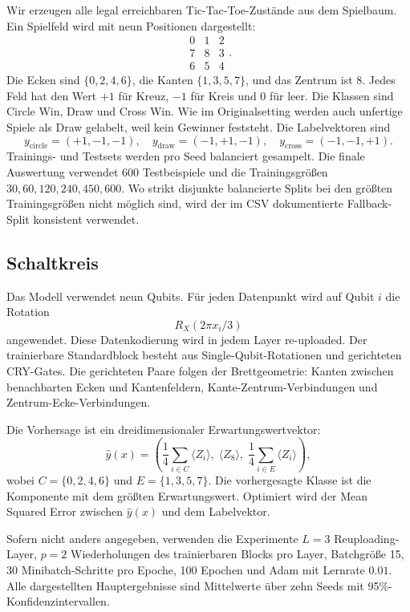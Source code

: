 Wir erzeugen alle legal erreichbaren Tic-Tac-Toe-Zustände aus dem Spielbaum. Ein Spielfeld wird mit neun Positionen dargestellt:
\[
\begin{matrix}
0 & 1 & 2\\
7 & 8 & 3\\
6 & 5 & 4
\end{matrix}.
\]
Die Ecken sind $\{0,2,4,6\}$, die Kanten $\{1,3,5,7\}$, und das Zentrum ist $8$. Jedes Feld hat den Wert $+1$ für Kreuz, $-1$ für Kreis und $0$ für leer. Die Klassen sind Circle Win, Draw und Cross Win. Wie im Originalsetting werden auch unfertige Spiele als Draw gelabelt, weil kein Gewinner feststeht. Die Labelvektoren sind
\[
y_{\mathrm{circle}}=(+1,-1,-1),\quad
y_{\mathrm{draw}}=(-1,+1,-1),\quad
y_{\mathrm{cross}}=(-1,-1,+1).
\]
Trainings- und Testsets werden pro Seed balanciert gesampelt. Die finale Auswertung verwendet 600 Testbeispiele und die Trainingsgrößen $30,60,120,240,450,600$. Wo strikt disjunkte balancierte Splits bei den größten Trainingsgrößen nicht möglich sind, wird der im CSV dokumentierte Fallback-Split konsistent verwendet.

\subsection{Schaltkreis}\label{subsec:circuit}

Das Modell verwendet neun Qubits. Für jeden Datenpunkt wird auf Qubit $i$ die Rotation
\begin{equation}
R_X(2\pi x_i/3)
\label{eq:encoding}
\end{equation}
angewendet. Diese Datenkodierung wird in jedem Layer re-uploaded. Der trainierbare Standardblock besteht aus Single-Qubit-Rotationen und gerichteten CRY-Gates. Die gerichteten Paare folgen der Brettgeometrie: Kanten zwischen benachbarten Ecken und Kantenfeldern, Kante-Zentrum-Verbindungen und Zentrum-Ecke-Verbindungen.

Die Vorhersage ist ein dreidimensionaler Erwartungswertvektor:
\begin{equation}
\hat y(x)=
\left(
\frac{1}{4}\sum_{i\in C}\langle Z_i\rangle,\;
\langle Z_8\rangle,\;
\frac{1}{4}\sum_{i\in E}\langle Z_i\rangle
\right),
\label{eq:readout}
\end{equation}
wobei $C=\{0,2,4,6\}$ und $E=\{1,3,5,7\}$. Die vorhergesagte Klasse ist die Komponente mit dem größten Erwartungswert. Optimiert wird der Mean Squared Error zwischen $\hat y(x)$ und dem Labelvektor.

Sofern nicht anders angegeben, verwenden die Experimente $L=3$ Reuploading-Layer, $p=2$ Wiederholungen des trainierbaren Blocks pro Layer, Batchgröße 15, 30 Minibatch-Schritte pro Epoche, 100 Epochen und Adam mit Lernrate $0.01$. Alle dargestellten Hauptergebnisse sind Mittelwerte über zehn Seeds mit 95\%-Konfidenzintervallen.

